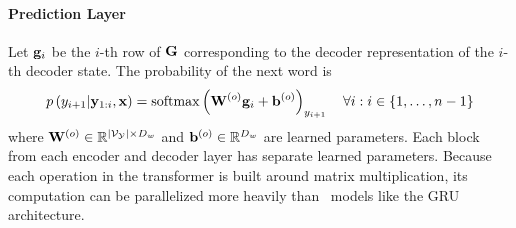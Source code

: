 \paragraph{{Prediction Layer}}
    Let $\mathbf{g}_i$ be the $i$-th row of $\mathbf{G}$ corresponding
to the decoder representation of the $i$-th decoder state. The probability of 
  the next word is
   \[ p\left(y_{i+1}|\mathbf{y}_{1:i},\mathbf{x}\right) 
   = \operatorname*{softmax}\left( \mathbf{W}^{(o)}\mathbf{g}_i + \mathbf{b}^{(o)} \right)_{y_{i+1}} \quad \forall i : i \in \{1,\ldots, n-1\}\]
  where $\mathbf{W}^{(o)} \in \mathbb{R}^{{\left\vert \mathcal{V}_{\mathcal{Y}} \right\vert} \times D_{w}}$ 
  and $\mathbf{b}^{(o)} \in \mathbb{R}^{D_{w}}$ are learned parameters. 
Each block from each encoder and decoder layer has separate learned parameters.
Because each operation in the transformer is built around matrix 
multiplication, its computation can be parallelized more heavily than
\recurrentneuralnetwork~models like the GRU architecture.
 
  
  
%




          

%
 


